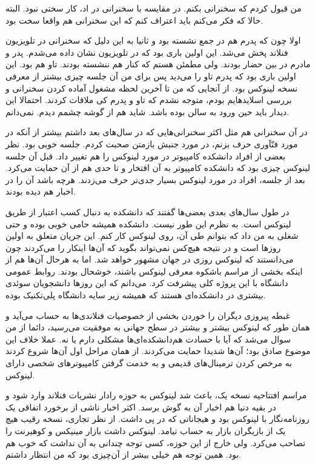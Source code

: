 من قبول کردم که سخنرانی بکنم. در مقایسه با سخنرانی در اد، کار سختی
نبود. البته حالا که فکر می‌کنم باید اعتراف کنم که این سخنرانی هم واقعا
سخت بود.

اولا چون که پدرم هم در جمع نشسته بود و ثانیا به این دلیل که سخنرانی در
تلویزیون فنلاند پخش می‌شد. این اولین باری بود که در تلویزیون نشان داده
می‌شدم. پدر و مادرم در بین حضار بودند. ولی مطمئن هستم که کنار هم ننشسته
بودند. تاو هم بود. این اولین باری بود که پدرم تاو را می‌دید پس برای من
آن جلسه چیزی بیشتر از معرفی نسخه  لینوکس بود. از آنجایی که
من تا آخرین لحظه مشغول آماده کردن سخنرانی و بررسی اسلایدهایم بودم،
متوجه نشدم که تاو و پدرم کی ملاقات کردند. احتمالا این دیدار باید حین
ورود به سالن بوده باشد. شاید هم از گوشه چشمم دیدم. نمی‌دانم.

در آن سخنرانی هم مثل اکثر سخنرانی‌هایی که در سال‌های بعد داشتم بیشتر از
آنکه در مورد فنّآوری حرف بزنم، در مورد جنبش بازمتن صحبت کردم. جلسه
خوبی بود. نظر بعضی از افراد دانشکده کامپیوتر در مورد لینوکس را هم
تغییر داد. قبل آن جلسه لینوکس چیزی بود که دانشکده کامپیوتر به آن
افتخار و تا حدی هم از آن حمایت می‌کرد. بعد از جلسه، افراد در مورد
لینوکس بسیار جدی‌تر حرف می‌زدند. هرچه باشد آن را در اخبار هم دیده بودند.

در طول سال‌های بعدی بعضی‌ها گفتند که دانشکده به دنبال کسب اعتبار از طریق
لینوکس است. به نظرم این طور نیست. دانشکده همیشه حامی خوبی بوده و حتی
شغلی به من داد که بتوانم طی آن، روی لینوکس کار کنم. این جریان متعلق به
اولین روزها است و در نتیجه هیچ‌کس نمی‌تواند بگوید که آ‌ن‌ها اینکار را
می‌کردند چون می‌دانستند که لینوکس روزی در جهان مشهور خواهد شد. اما به
هرحال آن‌ها هم از اینکه بخشی از مراسم باشکوه معرفی لینوکس باشند، خوشحال
بودند. روابط عمومی دانشگاه با این پروژه کلی پیشرفت کرد. می‌دانم که این
روزها دانشجویان سوئدی بیشتری در دانشکده‌ای هستند که همیشه زیر سایه
دانشگاه پلی‌تکنیک بوده.

غبطه پیروزی دیگران را خوردن بخشی از خصوصیات فنلاندی‌ها به حساب می‌آید و
همان طور که لینوکس بیشتر و بیشتر در سطح جهانی به موفقیت می‌رسید،‌ دائما
از من سوال می‌شد که آیا با حسادت هم‌دانشکده‌ای‌ها مشکلی دارم یا نه. عملا
خلاف این موضوع صادق بود؛ آن‌ها شدیدا حمایت می‌کردند. از همان مراحل اول
آن‌ها شروع کردند به مرخص کردن ترمینال‌های قدیمی و به خدمت گرفتن
کامپیوترهای شخصی دارای لینوکس.

مراسم افتتاحیه نسخه یک، باعث شد لینوکس به حوزه رادار نشریات فنلاند
وارد شود و در بقیه دنیا هم اخبار آن به گوش برسد. اکثر اخبار ناشی از
برخورد اتفاقی یک روزنامه‌نگار با لینوکس بود و هیجاناتی که در پی
داشت. از نظر تجاری، نسخه  رقیب هیچ یک از بازیگران بازار به حساب
نیامد. لینوکس داشت بازار مینیکس و کوهیرنت را تصاحب می‌کرد. ولی خارج از
این حوزه، کسی توجه چندانی به آن نداشت که خوب هم بود. همین توجه هم خیلی
بیشر از آن‌چیزی بود که من انتظار داشتم.

